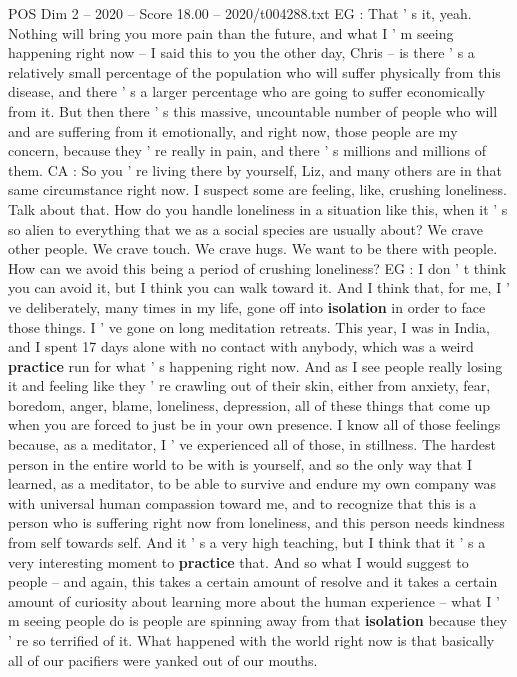\begin{textsample}{POS Dim 2 – 2020 – Score 18.00 – 2020/t004288.txt}
EG : That ' s it, yeah.
Nothing will bring you more pain than the future, and what I ' m seeing happening right now -- I said this to you the other day, Chris -- is there ' s a relatively small percentage of the population who will suffer physically from this disease, and there ' s a larger percentage who are going to suffer economically from it.
But then there ' s this massive, uncountable number of people who will and are suffering from it emotionally, and right now, those people are my concern, because they ' re really in pain, and there ' s millions and millions of them.
CA : So you ' re living there by yourself, Liz, and many others are in that same circumstance right now.
I suspect some are feeling, like, crushing loneliness.
Talk about that.
How do you handle loneliness in a situation like this, when it ' s so alien to everything that we as a social species are usually about?
We crave other people.
We crave touch.
We crave hugs.
We want to be there with people.
How can we avoid this being a period of crushing loneliness?
EG : I don ' t think you can avoid it, but I think you can walk toward it.
And I think that, for me, I ' ve deliberately, many times in my life, gone off into \textbf{isolation} in order to face those things.
I ' ve gone on long meditation retreats.
This year, I was in India, and I spent 17 days alone with no contact with anybody, which was a weird \textbf{practice} run for what ' s happening right now.
And as I see people really losing it and feeling like they ' re crawling out of their skin, either from anxiety, fear, boredom, anger, blame, loneliness, depression, all of these things that come up when you are forced to just be in your own presence.
I know all of those feelings because, as a meditator, I ' ve experienced all of those, in stillness.
The hardest person in the entire world to be with is yourself, and so the only way that I learned, as a meditator, to be able to survive and endure my own company was with universal human compassion toward me, and to recognize that this is a person who is suffering right now from loneliness, and this person needs kindness from self towards self.
And it ' s a very high teaching, but I think that it ' s a very interesting moment to \textbf{practice} that.
And so what I would suggest to people -- and again, this takes a certain amount of resolve and it takes a certain amount of curiosity about learning more about the human experience -- what I ' m seeing people do is people are spinning away from that \textbf{isolation} because they ' re so terrified of it.
What happened with the world right now is that basically all of our pacifiers were yanked out of our mouths.

\end{textsample}
